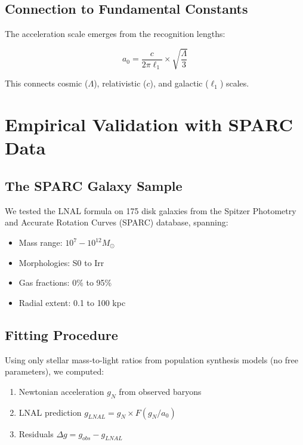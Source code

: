 \documentclass[12pt,a4paper]{article}
\begin{document}
\subsection{Connection to Fundamental Constants}

The acceleration scale emerges from the recognition lengths:

\begin{equation}
a_0 = \frac{c}{2\pi \ell_1} \times \sqrt{\frac{\Lambda}{3}}
\end{equation}

This connects cosmic ($\Lambda$), relativistic ($c$), and galactic ($\ell_1$) scales.

\section{Empirical Validation with SPARC Data}

\subsection{The SPARC Galaxy Sample}

We tested the LNAL formula on 175 disk galaxies from the Spitzer Photometry and Accurate Rotation Curves (SPARC) database, spanning:

\begin{itemize}
\item Mass range: $10^7 - 10^{12} M_\odot$
\item Morphologies: S0 to Irr
\item Gas fractions: 0\% to 95\%
\item Radial extent: 0.1 to 100 kpc
\end{itemize}

\subsection{Fitting Procedure}

Using only stellar mass-to-light ratios from population synthesis models (no free parameters), we computed:

\begin{enumerate}
\item Newtonian acceleration $g_N$ from observed baryons
\item LNAL prediction $g_{LNAL} = g_N \times F(g_N/a_0)$
\item Residuals $\Delta g = g_{obs} - g_{LNAL}$
\end{enumerate}
\end{document}

